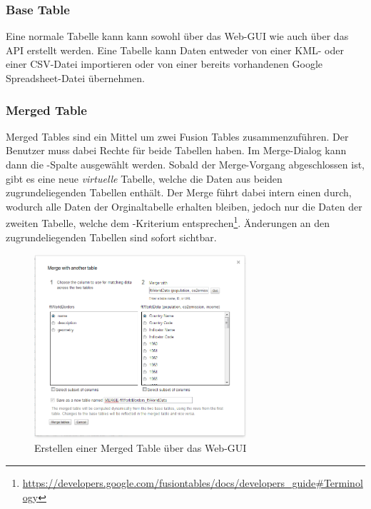 \subsubsection{Base Table}
Eine normale Tabelle kann kann sowohl über das Web-GUI wie auch über das API erstellt werden. Eine Tabelle kann Daten entweder von einer \gls{KML}- oder einer \gls{CSV}-Datei importieren oder von einer bereits vorhandenen Google Spreadsheet-Datei übernehmen.

\subsubsection{Merged Table}
\label{merge-table}
Merged Tables sind ein Mittel um zwei Fusion Tables zusammenzuführen. Der Benutzer muss dabei Rechte für beide Tabellen haben. Im \gls{Merge}-Dialog kann dann die -Spalte ausgewählt werden. Sobald der \gls{Merge}-Vorgang abgeschlossen ist, gibt es eine neue \emph{virtuelle} Tabelle, welche die Daten aus beiden zugrundeliegenden Tabellen enthält. Der \gls{Merge} führt dabei intern einen  durch, wodurch alle Daten der Orginaltabelle erhalten bleiben, jedoch nur die Daten der zweiten Tabelle, welche dem -Kriterium entsprechen\footnote{ \url{https://developers.google.com/fusiontables/docs/developers_guide\#Terminology}}. Änderungen an den zugrundeliegenden Tabellen sind sofort sichtbar.

\begin{figure}[!ht]
	\centering
	\includegraphics[width=0.7\textwidth]{images/usecase1-worlddata/documentation/worlddata-merge2}
	\caption{Erstellen einer \gls{Merge}d Table über das Web-GUI}
	\label{create-merge-table}
\end{figure}

